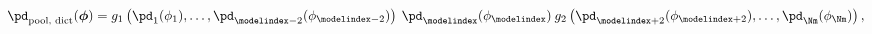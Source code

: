 \begin{equation}
  \pd_{\text{pool, dict}}(\boldsymbol{\phi}) = 
    g_{1}\left(\pd_{1}(\phi_{1}), \ldots, \pd_{\modelindex - 2}(\phi_{\modelindex - 2})\right)
    \: \pd_{\modelindex}(\phi_{\modelindex}) \:
    g_{2}\left(\pd_{\modelindex + 2}(\phi_{\modelindex + 2}), \ldots, \pd_{\Nm}(\phi_{\Nm})\right),
  \label{eqn:dictatorial-one-submodel}
\end{equation}
